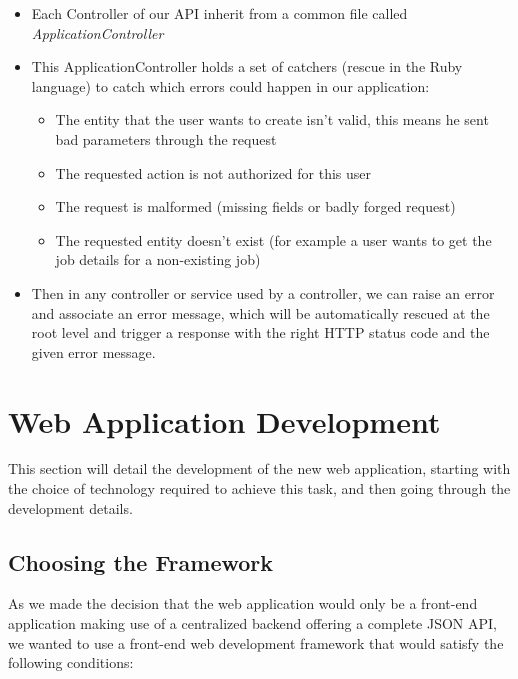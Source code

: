 \documentclass{eplmastersthesis}
\begin{document}
          \begin{itemize}
            \item Each Controller of our API inherit from a common file
            called \textit{ApplicationController}
            \item This ApplicationController holds a set of catchers (rescue
            in the Ruby language) to catch which errors could happen in our
            application:
              \begin{itemize}
                \item The entity that the user wants to create isn't valid, this
                means he sent bad parameters through the request
                \item The requested action is not authorized for this user
                \item The request is malformed (missing fields or badly forged
                request)
                \item The requested entity doesn't exist (for example a user
                wants to get the job details for a non-existing job)
              \end{itemize}
            \item Then in any controller or service used by a controller, we
            can raise an error and associate an error message, which will be
            automatically rescued at the root level and trigger a response with
            the right HTTP status code and the given error message.
          \end{itemize}

    \section{Web Application Development}

      This section will detail the development of the new web application,
      starting with the choice of technology required to achieve this task, and
      then going through the development details.

      \subsection{Choosing the Framework}

        As we made the decision that the web application would only be a
        front-end application making use of a centralized backend offering
        a complete JSON API, we wanted to use a front-end web development
        framework that would satisfy the following conditions: \\
\end{document}
